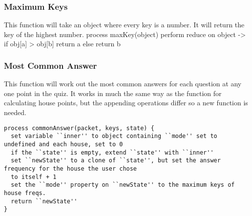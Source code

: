 \subsubsection{Maximum Keys}
This function will take an object where every key is a number. It will return the key of the highest number.
process maxKey(object) {
  perform reduce on object ->
  if obj[a] > obj[b] return a
  else return b
}

\subsubsection{Most Common Answer}
This function will work out the most common answers for each question at any one point in the quiz. It works in much the same way as the function for calculating house points, but the appending operations differ so a new function is needed.
\begin{verbatim}
process commonAnswer(packet, keys, state) {
  set variable ``inner'' to object containing ``mode'' set to undefined and each house, set to 0
  if the ``state'' is empty, extend ``state'' with ``inner''
  set ``newState'' to a clone of ``state'', but set the answer frequency for the house the user chose
  to itself + 1
  set the ``mode'' property on ``newState'' to the maximum keys of house freqs.
  return ``newState''
}
\end{verbatim}
